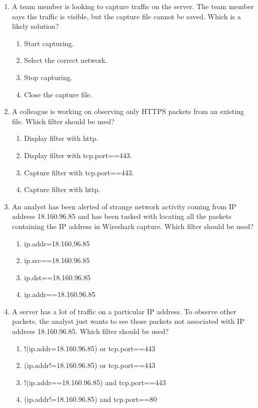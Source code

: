 \documentclass{article}
\newcommand{\incorrectOption}{\item[\textbf{\Circle}]}
\begin{document}
\begin{enumerate}[leftmargin=*, label=\textbf{Q\arabic*}, itemsep=-5pt]
\item A team member is looking to capture traffic on the server. The
  team member says the traffic is visible, but the capture file cannot
  be saved. Which is a likely solution? 
  \begin{enumerate}[itemsep=-3.5pt, label={}]
  \incorrectOption Start capturing.
  \incorrectOption Select the correct network. 
  \incorrectOption Stop capturing.
  \incorrectOption Close the capture file.
  \end{enumerate}  
 
\item A colleague is working on observing only HTTPS packets from an
  existing file. Which filter should be used?  
  \begin{enumerate}[itemsep=-3.5pt, label={}]
  \incorrectOption Display filter with {http}. 
  \incorrectOption Display filter with {tcp.port==443}.
  \incorrectOption Capture filter with {tcp.port==443}.
  \incorrectOption Capture filter with {http}.
  \end{enumerate}
 
\item An analyst has been alerted of strange network activity coming
  from IP address 18.160.96.85 and has been tasked with locating all
  the packets containing the IP address in Wireshark capture. Which
  filter should be used?  
  \begin{enumerate}[itemsep=-3.5pt, label={}]
  \incorrectOption ip.addr=18.160.96.85
  \incorrectOption ip.src==18.160.96.85
  \incorrectOption ip.dst==18.160.96.85
  \incorrectOption ip.addr==18.160.96.85
\end{enumerate}

\item A server has a lot of traffic on a particular IP address. To
  observe other packets, the analyst just wants to see those packets
  not associated with IP address 18.160.96.85. Which filter should be used? 
  \begin{enumerate}[itemsep=-3.5pt, label={}]
  \incorrectOption !(ip.addr=18.160.96.85) or tcp.port==443
  \incorrectOption (ip.addr!=18.160.96.85) or tcp.port==443
  \incorrectOption !(ip.addr==18.160.96.85) and tcp.port==443
  \incorrectOption (ip.addr!=18.160.96.85) and tcp.port==80
  \end{enumerate}
\end{enumerate}
\end{document}
